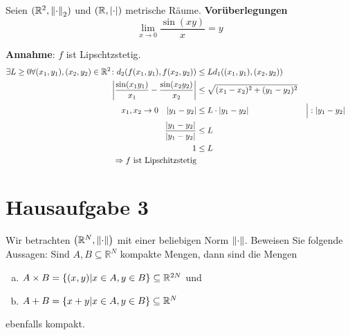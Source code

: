 \documentclass{scrreprt}
\begin{document}
Seien $(\mathbb{R}^2, \norm{\cdot}_2)$ und $(\mathbb{R}, \abs{\cdot})$
metrische Räume. \textbf{Vorüberlegungen}
\[
  \lim_{x \to 0} \frac{\sin(xy)}{x} = y
\]

\textbf{Annahme}: $f$ ist Lipschtzstetig.
\begin{align*}
  \exists L \geq 0 \forall (x_1, y_1), (x_2, y_2) \in \mathbb{R}^2 \colon d_2(f(x_1, y_1), f(x_2, y_2)) &\leq L d_1((x_1, y_1), (x_2, y_2)) \\
  \abs{\frac{\sin(x_1y_1)}{x_1} - \frac{\sin(x_2y_2)}{x_2}} &\leq\sqrt{(x_1 - x_2)^2 + (y_1 - y_2)^2} \\
x_1, x_2 \to 0 \quad  \abs{y_1 - y_2} &\leq L \cdot \abs{y_1 - y_2} && \Big| :\abs{y_1 - y_2} \\
  \frac{\abs{y_1 - y_2}}{\abs{y_1 - y_2}} &\leq L \\
  1 &\leq L \\
  \Rightarrow f \text{ ist Lipschitzstetig}
\end{align*}

\newpage
\section*{Hausaufgabe 3}

Wir betrachten $\qty(\mathbb{R}^N, \norm{\cdot})$ mit einer beliebigen Norm
$\norm{\cdot}$.
Beweisen Sie folgende Aussagen: Sind $A, B \subseteq \mathbb{R}^N$ kompakte
Mengen, dann sind die Mengen
\begin{enumerate}[a)]
\item $A \times B = \qty{(x, y) \middle| x \in A, y \in B} \subseteq \mathbb{R}^{2N}$ und
\item $A + B = \qty{x + y \middle| x \in A, y \in B} \subseteq \mathbb{R}^N$
\end{enumerate}
ebenfalls kompakt. \\
\end{document}
